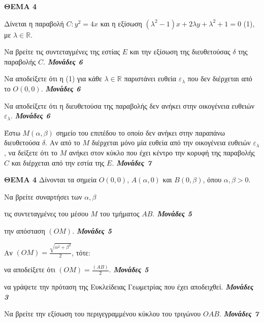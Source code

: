 \documentclass[11pt,a4paper,twoside]{book}
\newcommand{\OnPar}[1]{{\notoserif\bfseries\fontsize{18}{22}\selectfont #1}}
\newcommand{\monades}[1]{
\hspace*{\fill}
\textbf{\textit{\textcolor{maincolor}{Μονάδες #1}}}}
\begin{document}
\vspace{4mm}

\vspace{4mm}
\OnPar{ΘΕΜΑ 4}

Δίνεται η παραβολή $C : y^2 = 4x$ και η εξίσωση $(\lambda^2 -1)x+2\lambda y+\lambda^2 +1=0$ (1), με $\lambda \in \mathbb{R}$.

\begin{alist}    \item Να βρείτε τις συντεταγμένες της εστίας $E$ και την εξίσωση της διευθετούσας $\delta$ της παραβολής $C$. \monades{6}
    \item Να αποδείξετε ότι η (1) για κάθε $\lambda \in \mathbb{R}$ παριστάνει ευθεία $\varepsilon_\lambda$ που δεν διέρχεται από το $O(0,0)$. \monades{6}
    \item Να αποδείξετε ότι η διευθετούσα της παραβολής δεν ανήκει στην οικογένεια ευθειών $\varepsilon_\lambda$. \monades{6}
    \item Έστω $M(\alpha, \beta)$ σημείο του επιπέδου το οποίο δεν ανήκει στην παραπάνω διευθετούσα $\delta$. Αν από το $M$ διέρχεται μόνο μία ευθεία από την οικογένεια ευθειών $\varepsilon_\lambda$, να δείξετε ότι το $M$ ανήκει στον κύκλο που έχει κέντρο την κορυφή της παραβολής $C$ και διέρχεται από την εστία της $E$. \monades{7}\end{alist}

\vspace{4mm}

\OnPar{ΘΕΜΑ 4}
Δίνονται τα σημεία $O(0,0)$, $A(\alpha,0)$ και $B(0, \beta)$, όπου $\alpha, \beta >0$.

\begin{alist}    \item Να βρείτε συναρτήσει των $\alpha,\beta$
    \begin{rlist}
        \item τις συντεταγμένες του μέσου $M$ του τμήματος $AB$. \monades{5}
        \item την απόσταση $(OM)$. \monades{5}
    \end{rlist}
    \item Αν $(OM) = \frac{\sqrt{\alpha^2 + \beta^2}}{2}$, τότε:
    \begin{rlist}
        \item να αποδείξετε ότι $(OM) = \frac{(AB)}{2}$. \monades{5}
        \item να γράψετε την πρόταση της Ευκλείδειας Γεωμετρίας που έχει αποδειχθεί. \monades{3}
    \end{rlist}
    \item Να βρείτε την εξίσωση του περιγεγραμμένου κύκλου του τριγώνου $OAB$. \monades{7}\end{alist}
\end{document}
